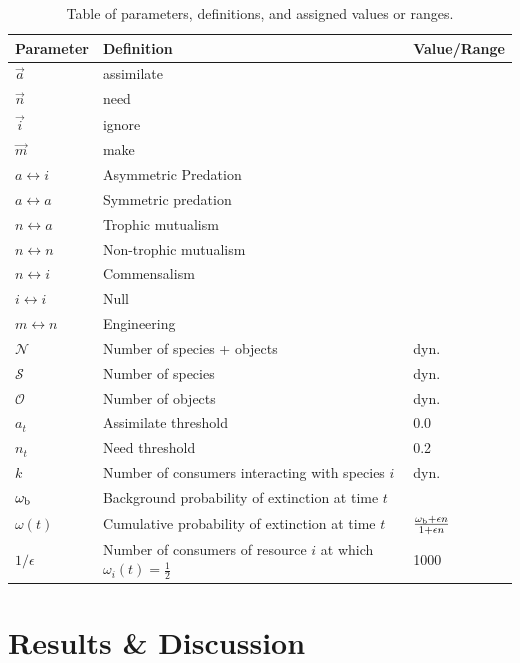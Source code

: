 \documentclass[twocolumn,preprintnumbers,amsmath,amssymb,superscriptaddress]{revtex4}
\begin{document}
\begin{table}[!t]
\begin{center}
\begin{tabular}{ l l l }
\hline
Parameter & Definition & Value/Range \\
\hline
$\overrightarrow{a}$ & assimilate & \\
$\overrightarrow{n}$ & need & \\
$\overrightarrow{i}$ & ignore & \\
$\overrightarrow{m}$ & make & \\
\hline
$a \leftrightarrow i$ & Asymmetric Predation &  \\
$a \leftrightarrow a$ & Symmetric predation & \\
$n \leftrightarrow a$ & Trophic mutualism & \\
$n \leftrightarrow n$ & Non-trophic mutualism & \\
$n \leftrightarrow i$ & Commensalism & \\
$i \leftrightarrow i$ & Null & \\
$m \leftrightarrow n$ & Engineering & \\
\hline
$\mathcal{N}$ & Number of species + objects & dyn.\\
$\mathcal{S}$ & Number of species & dyn.\\
$\mathcal{O}$ & Number of objects & dyn.\\
$a_t$ & Assimilate threshold & 0.0\\
$n_t$ & Need threshold & 0.2\\
$k$ & Number of consumers interacting with species $i$ & dyn.\\
$\omega_{\rm b}$ & Background probability of extinction at time $t$\\
$\omega(t)$ & Cumulative probability of extinction at time $t$ & $\frac{\omega_{\rm b} + \epsilon n}{1 + \epsilon n}$\\
$1/\epsilon$ & Number of consumers of resource $i$ at which $\omega_i(t)=\frac{1}{2}$ & 1000\\
\hline
\end{tabular}
\end{center}
\caption{Table of parameters, definitions, and assigned values or ranges.}
\end{table}




\section*{Results \& Discussion}
\end{document}
